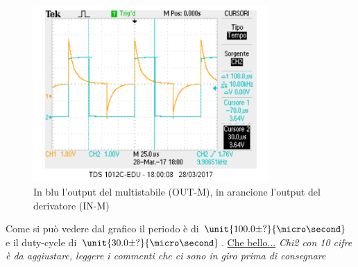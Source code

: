 \documentclass[a4paper,10pt]{article}
\begin{document}
 \begin{figure}[H]
	\centering
	\includegraphics[width=0.8\textwidth]{../grafici/410030.png}
	\caption{In blu l'output del multistabile (OUT-M), in arancione l'output del derivatore (IN-M)}
	\label{fig:410030}
\end{figure}

Come si può vedere dal grafico il periodo è di $\unit{100.0 \pm ?}{\micro\second}$ e il duty-cycle di $\unit{30.0 \pm ?}{\micro\second}$.
\underline{Che bello...}
\emph{Chi2 con 10 cifre è da aggiustare, leggere i commenti che ci sono in giro prima di consegnare}
\end{document}
